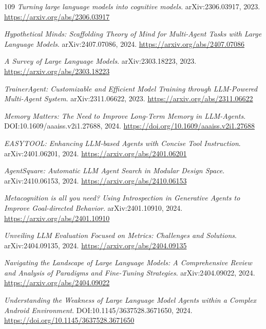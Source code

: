 \documentclass[11pt,a4paper]{article}
\begin{document}
\begin{thebibliography}{109}
\newblock \emph{Turning large language models into cognitive models}.
\newblock arXiv:2306.03917, 2023.
\newblock \url{https://arxiv.org/abs/2306.03917}

\newblock \emph{Hypothetical Minds: Scaffolding Theory of Mind for Multi-Agent Tasks with Large Language Models}.
\newblock arXiv:2407.07086, 2024.
\newblock \url{https://arxiv.org/abs/2407.07086}

\newblock \emph{A Survey of Large Language Models}.
\newblock arXiv:2303.18223, 2023.
\newblock \url{https://arxiv.org/abs/2303.18223}

\newblock \emph{TrainerAgent: Customizable and Efficient Model Training through LLM-Powered Multi-Agent System}.
\newblock arXiv:2311.06622, 2023.
\newblock \url{https://arxiv.org/abs/2311.06622}

\newblock \emph{Memory Matters: The Need to Improve Long-Term Memory in LLM-Agents}.
\newblock DOI:10.1609/aaaiss.v2i1.27688, 2024.
\newblock \url{https://doi.org/10.1609/aaaiss.v2i1.27688}

\newblock \emph{EASYTOOL: Enhancing LLM-based Agents with Concise Tool Instruction}.
\newblock arXiv:2401.06201, 2024.
\newblock \url{https://arxiv.org/abs/2401.06201}

\newblock \emph{AgentSquare: Automatic LLM Agent Search in Modular Design Space}.
\newblock arXiv:2410.06153, 2024.
\newblock \url{https://arxiv.org/abs/2410.06153}

\newblock \emph{Metacognition is all you need? Using Introspection in Generative Agents to Improve Goal-directed Behavior}.
\newblock arXiv:2401.10910, 2024.
\newblock \url{https://arxiv.org/abs/2401.10910}

\newblock \emph{Unveiling LLM Evaluation Focused on Metrics: Challenges and Solutions}.
\newblock arXiv:2404.09135, 2024.
\newblock \url{https://arxiv.org/abs/2404.09135}

\newblock \emph{Navigating the Landscape of Large Language Models: A Comprehensive Review and Analysis of Paradigms and Fine-Tuning Strategies}.
\newblock arXiv:2404.09022, 2024.
\newblock \url{https://arxiv.org/abs/2404.09022}

\newblock \emph{Understanding the Weakness of Large Language Model Agents within a Complex Android Environment}.
\newblock DOI:10.1145/3637528.3671650, 2024.
\newblock \url{https://doi.org/10.1145/3637528.3671650}


\end{thebibliography}
\end{document}
